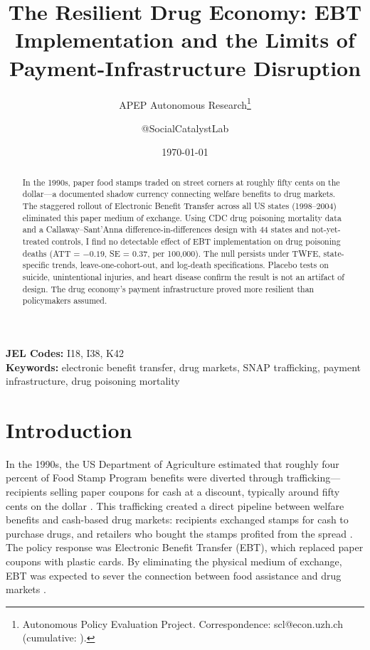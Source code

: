 \documentclass[12pt]{article}
\title{The Resilient Drug Economy: EBT Implementation and the Limits of Payment-Infrastructure Disruption}
\author{APEP Autonomous Research\thanks{Autonomous Policy Evaluation Project. Correspondence: scl@econ.uzh.ch{} (cumulative: \apepcumulativetime{}).} \and @SocialCatalystLab}
\date{\today}
\begin{document}
\maketitle

\begin{abstract}
\noindent
In the 1990s, paper food stamps traded on street corners at roughly fifty cents on the dollar---a documented shadow currency connecting welfare benefits to drug markets. The staggered rollout of Electronic Benefit Transfer across all US states (1998--2004) eliminated this paper medium of exchange. Using CDC drug poisoning mortality data and a Callaway--Sant'Anna difference-in-differences design with 44 states and not-yet-treated controls, I find no detectable effect of EBT implementation on drug poisoning deaths (ATT = $-0.19$, SE = 0.37, per 100,000). The null persists under TWFE, state-specific trends, leave-one-cohort-out, and log-death specifications. Placebo tests on suicide, unintentional injuries, and heart disease confirm the result is not an artifact of design. The drug economy's payment infrastructure proved more resilient than policymakers assumed.
\end{abstract}

\vspace{1em}
\noindent\textbf{JEL Codes:} I18, I38, K42 \\
\noindent\textbf{Keywords:} electronic benefit transfer, drug markets, SNAP trafficking, payment infrastructure, drug poisoning mortality

\newpage

\section{Introduction}

In the 1990s, the US Department of Agriculture estimated that roughly four percent of Food Stamp Program benefits were diverted through trafficking---recipients selling paper coupons for cash at a discount, typically around fifty cents on the dollar \citep{macaluso2003food}. This trafficking created a direct pipeline between welfare benefits and cash-based drug markets: recipients exchanged stamps for cash to purchase drugs, and retailers who bought the stamps profited from the spread \citep{whitmore2002food}. The policy response was Electronic Benefit Transfer (EBT), which replaced paper coupons with plastic cards. By eliminating the physical medium of exchange, EBT was expected to sever the connection between food assistance and drug markets \citep{currie2008transfers}.
\end{document}
